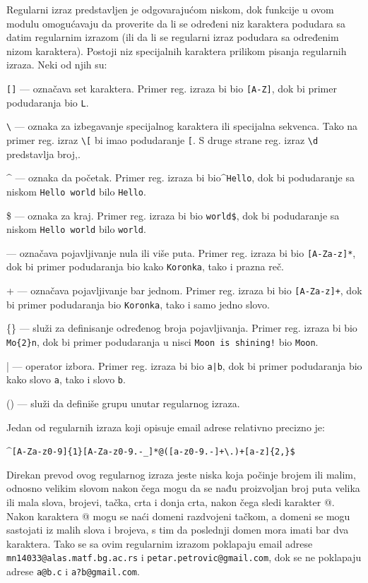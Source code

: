 \documentclass[12pt,oneside]{memoir}
\theoremstyle{plain}
\theoremstyle{definition}
\begin{document}
Regularni izraz predstavljen je odgovarajućom niskom, dok funkcije u ovom modulu omogućavaju da proverite da li se određeni niz karaktera podudara sa datim regularnim izrazom (ili da li se regularni izraz podudara sa određenim nizom karaktera).
Postoji niz specijalnih karaktera prilikom pisanja regularnih izraza. Neki od njih su:
\begin{description}
	\item \texttt{[]} --- označava set karaktera. Primer reg. izraza bi bio \texttt{[A-Z]}, dok bi primer podudaranja bio \texttt{L}.
	\item \texttt{\textbackslash} --- oznaka za izbegavanje specijalnog karaktera ili specijalna sekvenca. Tako na primer reg. izraz \texttt{\textbackslash[} bi imao podudaranje \texttt{[}. S druge strane reg. izraz \texttt{\textbackslash d}  predstavlja broj,.
	\item $\^$ --- oznaka da početak. Primer reg. izraza bi bio\quad \texttt{$\^$Hello}, dok bi podudaranje sa niskom \texttt{Hello world} bilo \texttt{Hello}.
	\item \$ --- oznaka za kraj. Primer reg. izraza bi bio \texttt{world\$}, dok bi podudaranje sa niskom \texttt{Hello world} bilo \texttt{world}.
	\item * --- označava pojavljivanje nula ili više puta. Primer reg. izraza bi bio \texttt{[A-Za-z]*}, dok bi primer podudaranja bio kako \texttt{Koronka}, tako i prazna reč.
	\item + --- označava pojavljivanje bar jednom. Primer reg. izraza bi bio \texttt{[A-Za-z]+}, dok bi primer podudaranja bio \texttt{Koronka}, tako i samo jedno slovo.
	\item \{\} --- služi za definisanje određenog broja pojavljivanja. Primer reg. izraza bi bio \texttt{Mo\{2\}n}, dok bi primer podudaranja u nisci \texttt{Moon is shining!} bio \texttt{Moon}.
	\item | --- operator izbora.  Primer reg. izraza bi bio \texttt{a|b}, dok bi primer podudaranja bio kako slovo \texttt{a}, tako i slovo \texttt{b}.
	\item () --- služi da definiše grupu unutar regularnog izraza.
\end{description}

Jedan od regularnih izraza koji opisuje email adrese relativno precizno je: 
\begin{center}
\texttt{$\^$[A-Za-z0-9]\{1\}[A-Za-z0-9.-\_]*@([a-z0-9.-]+\textbackslash .)+[a-z]\{2,\}\$}
\end{center}
Direkan prevod ovog regularnog izraza jeste niska koja počinje brojem ili malim, odnosno velikim slovom nakon čega mogu da se nađu proizvoljan broj puta velika ili mala slova, brojevi, tačka, crta i donja crta, nakon čega sledi karakter @. Nakon karaktera @ mogu se naći domeni razdvojeni tačkom, a domeni se mogu sastojati iz malih slova i brojeva, s tim da poslednji domen mora imati bar dva karaktera. Tako se sa ovim regularnim izrazom poklapaju email adrese \texttt{mn14033@alas.matf.bg.ac.rs} i \texttt{petar.petrovic@gmail.com}, dok se ne poklapaju adrese \texttt{a@b.c} i \texttt{a?b@gmail.com}.
\end{document}
